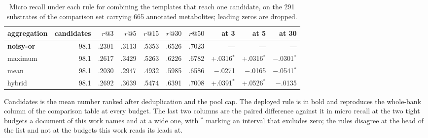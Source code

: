 \begin{table}[h]
\centering\small
\begin{threeparttable}
\caption{Micro recall under each rule for combining the templates that reach one candidate, on the 291 substrates of the comparison set carrying 665 annotated metabolites; leading zeros are dropped.}
\label{tab:si-aggregation}
\begin{tabular}{@{}lrrrrrrrrr@{}}
\toprule
aggregation & candidates & $r@3$ & $r@5$ & $r@15$ & $r@30$ & $r@50$ & at 3 & at 5 & at 30 \\
\midrule
\textbf{noisy-or} & 98.1 & .2301 & .3113 & .5353 & .6526 & .7023 & --- & --- & --- \\
maximum & 98.1 & .2617 & .3429 & .5263 & .6226 & .6782 & +.0316$^{*}$ & +.0316$^{*}$ & $-$.0301$^{*}$ \\
mean & 98.1 & .2030 & .2947 & .4932 & .5985 & .6586 & $-$.0271 & $-$.0165 & $-$.0541$^{*}$ \\
hybrid & 98.1 & .2692 & .3639 & .5474 & .6391 & .7008 & +.0391$^{*}$ & +.0526$^{*}$ & $-$.0135 \\
\bottomrule
\end{tabular}
\begin{tablenotes}[flushleft]\footnotesize
\item Candidates is the mean number ranked after deduplication and the pool cap. The deployed rule is in bold and reproduces the whole-bank column of the comparison table at every budget. The last two columns are the paired difference against it in micro recall at the two tight budgets a document of this work names and at a wide one, with $^{*}$ marking an interval that excludes zero; the rules disagree at the head of the list and not at the budgets this work reads its leads at.
\end{tablenotes}
\end{threeparttable}
\end{table}
